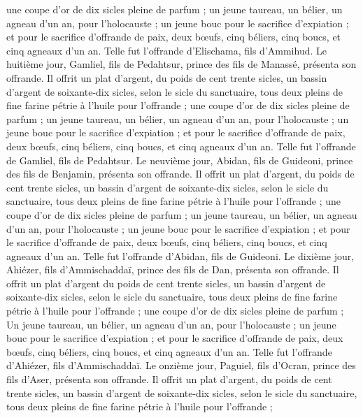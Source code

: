 \begin{multicols}{2}
une coupe d'or de dix sicles pleine de parfum ;
un jeune taureau, un bélier, un agneau d'un an, pour l'holocauste ;
un jeune bouc pour le sacrifice d'expiation ;
et pour le sacrifice d'offrande de paix, deux bœufs, cinq béliers, cinq boucs, et cinq agneaux d'un an. Telle fut l'offrande d'Elischama, fils d'Ammihud.
Le huitième jour, Gamliel, fils de Pedahtsur, prince des fils de Manassé, présenta son offrande.
Il offrit un plat d'argent, du poids de cent trente sicles, un bassin d'argent de soixante-dix sicles, selon le sicle du sanctuaire, tous deux pleins de fine farine pétrie à l'huile pour l'offrande ;
une coupe d'or de dix sicles pleine de parfum ;
un jeune taureau, un bélier, un agneau d'un an, pour l'holocauste ;
un jeune bouc pour le sacrifice d'expiation ;
et pour le sacrifice d'offrande de paix, deux bœufs, cinq béliers, cinq boucs, et cinq agneaux d'un an. Telle fut l'offrande de Gamliel, fils de Pedahtsur.
Le neuvième jour, Abidan, fils de Guideoni, prince des fils de Benjamin, présenta son offrande.
Il offrit un plat d'argent, du poids de cent trente sicles, un bassin d'argent de soixante-dix sicles, selon le sicle du sanctuaire, tous deux pleins de fine farine pétrie à l'huile pour l'offrande ;
une coupe d'or de dix sicles pleine de parfum ;
un jeune taureau, un bélier, un agneau d'un an, pour l'holocauste ;
un jeune bouc pour le sacrifice d'expiation ;
et pour le sacrifice d'offrande de paix, deux bœufs, cinq béliers, cinq boucs, et cinq agneaux d'un an. Telle fut l'offrande d'Abidan, fils de Guideoni.
Le dixième jour, Ahiézer, fils d'Ammischaddaï, prince des fils de Dan, présenta son offrande.
Il offrit un plat d'argent du poids de cent trente sicles, un bassin d'argent de soixante-dix sicles, selon le sicle du sanctuaire, tous deux pleins de fine farine pétrie à l'huile pour l'offrande ;
une coupe d'or de dix sicles pleine de parfum ;
Un jeune taureau, un bélier, un agneau d'un an, pour l'holocauste ;
un jeune bouc pour le sacrifice d'expiation ;
et pour le sacrifice d'offrande de paix, deux bœufs, cinq béliers, cinq boucs, et cinq agneaux d'un an. Telle fut l'offrande d'Ahiézer, fils d'Ammischaddaï.
Le onzième jour, Paguiel, fils d'Ocran, prince des fils d'Aser, présenta son offrande.
Il offrit un plat d'argent, du poids de cent trente sicles, un bassin d'argent de soixante-dix sicles, selon le sicle du sanctuaire, tous deux pleins de fine farine pétrie à l'huile pour l'offrande ;

\end{multicols}
